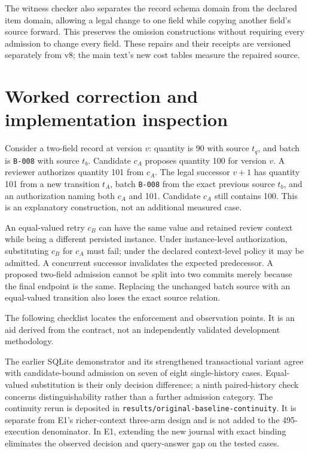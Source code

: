 \documentclass[preprint,12pt,authoryear]{elsarticle}
\newcommand{\code}[1]{\nolinkurl{#1}}
\begin{document}
The witness checker also separates the record schema domain from the declared item domain, allowing a legal change to one field while copying another field's source forward. This preserves the omission constructions without requiring every admission to change every field. These repairs and their receipts are versioned separately from v8; the main text's new cost tables measure the repaired source.

\section{Worked correction and implementation inspection}
\label{app:worked-example}

Consider a two-field record at version $v$: quantity is 90 with source $t_q$, and batch is \code{B-008} with source $t_b$. Candidate $c_A$ proposes quantity 100 for version $v$. A reviewer authorizes quantity 101 from $c_A$. The legal successor $v+1$ has quantity 101 from a new transition $t_A$, batch \code{B-008} from the exact previous source $t_b$, and an authorization naming both $c_A$ and 101. Candidate $c_A$ still contains 100. This is an explanatory construction, not an additional measured case.

An equal-valued retry $c_B$ can have the same value and retained review context while being a different persisted instance. Under instance-level authorization, substituting $c_B$ for $c_A$ must fail; under the declared context-level policy it may be admitted. A concurrent successor invalidates the expected predecessor. A proposed two-field admission cannot be split into two commits merely because the final endpoint is the same. Replacing the unchanged batch source with an equal-valued transition also loses the exact source relation.

The following checklist locates the enforcement and observation points. It is an aid derived from the contract, not an independently validated development methodology.


The earlier SQLite demonstrator and its strengthened transactional variant agree with candidate-bound admission on seven of eight single-history cases. Equal-valued substitution is their only decision difference; a ninth paired-history check concerns distinguishability rather than a further admission category. The continuity rerun is deposited in \code{results/original-baseline-continuity}. It is separate from E1's richer-context three-arm design and is not added to the 495-execution denominator. In E1, extending the new journal with exact binding eliminates the observed decision and query-answer gap on the tested cases.
\end{document}
